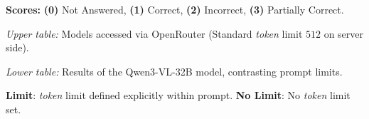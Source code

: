 \begin{table}[htbp]
\begin{threeparttable}
        \begin{tablenotes}\footnotesize
            \item \textbf{Scores:} \textbf{(0)} Not Answered, \textbf{(1)} Correct, \textbf{(2)} Incorrect, \textbf{(3)} Partially Correct.
            \item \textit{Upper table:} Models accessed via OpenRouter (Standard \textit{token} limit $512$ on server side).
            \item \textit{Lower table:} Results of the Qwen3-VL-32B model, contrasting prompt limits.
            \item \textbf{Limit}: \textit{token} limit defined explicitly within prompt. \textbf{No Limit}: No \textit{token} limit set.
        \end{tablenotes}
    \end{threeparttable}
\end{table}

